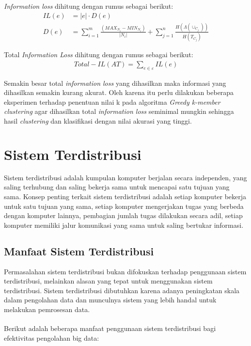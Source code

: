 \noindent \textit{Information loss} dihitung dengan rumus sebagai berikut:
\begin{align}
IL(e)&= |e| \cdot D(e) \\
D(e) &= \sum_{i=1}^{m} \frac{(MAX_{N_i} - MIN_{N_i})}{|N_i|} + \sum_{j=1}^{n}\frac{H(\Lambda(\cup_{C_j}))}{H(T_{C_j})}
\end{align}

\noindent Total \textit{Information Loss} dihitung dengan rumus sebagai berikut:
\begin{align}
Total-IL(AT) = \sum_{e \in \varepsilon}^{}  IL(e)
\end{align}

\noindent Semakin besar total \textit{information loss} yang dihasilkan maka informasi yang dihasilkan semakin kurang akurat. Oleh karena itu perlu dilakukan beberapa eksperimen terhadap penentuan nilai k pada algoritma \textit{Greedy k-member clustering} agar dihasilkan total \textit{information loss} seminimal mungkin sehingga hasil \textit{clustering} dan klasifikasi dengan nilai akurasi yang tinggi.

\newpage
\section{Sistem Terdistribusi}
Sistem terdistribusi adalah kumpulan komputer berjalan secara independen, yang saling terhubung dan saling bekerja sama untuk mencapai satu tujuan yang sama. Konsep penting terkait sistem terdistribusi adalah setiap komputer bekerja untuk satu tujuan yang sama, setiap komputer mengerjakan tugas yang berbeda dengan komputer lainnya, pembagian jumlah tugas dilakukan secara adil, setiap komputer memiliki jalur komunikasi yang sama untuk saling bertukar informasi.

\subsection{Manfaat Sistem Terdistribusi}
Permasalahan sistem terdistribusi bukan difokuskan terhadap penggunaan sistem terdistribusi, melainkan alasan yang tepat untuk menggunakan sistem terdistribusi. Sistem terdistribusi dibutuhkan karena adanya peningkatan skala dalam pengolahan data dan munculnya sistem yang lebih handal untuk melakukan pemrosesan data. 
\\\\
Berikut adalah beberapa manfaat penggunaan sistem terdistribusi bagi efektivitas pengolahan big data:

